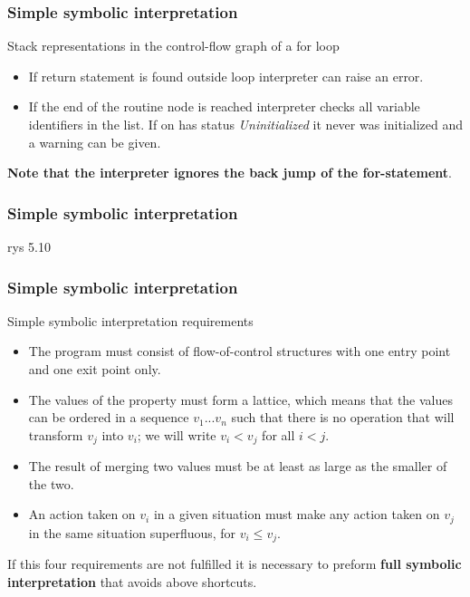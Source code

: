 \documentclass[presentation]{beamer}
\begin{document}
\begin{frame}
  \frametitle{Simple symbolic interpretation}
  \begin{block}{Stack representations in the control-flow graph of a for loop}
  \begin{itemize}
      \item If return statement is found outside loop interpreter can raise an error.
      \item If the end of the routine node is reached interpreter checks all variable identifiers in the list. If on has status \emph{Uninitialized} it never was initialized and a warning can be given.
  \end{itemize}
  \textbf{Note that the interpreter ignores the back jump of the for-statement}.
  \end{block}
  
\end{frame}

\begin{frame}
  \frametitle{Simple symbolic interpretation}
  rys 5.10
  
\end{frame}

\begin{frame}
  \frametitle{Simple symbolic interpretation}
  \begin{block}{Simple symbolic interpretation requirements}
  \begin{itemize}
      \item The program must consist of flow-of-control structures with one entry point and one exit point only.
      \item The values of the property must form a lattice, which means that the values can be ordered in a sequence $v_1...v_n$ such that there is no operation that will transform $v_j$ into $v_i$; we will write $v_i < v_j$ for all $i<j$.
      \item The result of merging two values must be at least as large as the smaller of the two.
      \item An action taken on $v_i$ in a given situation must make any action taken on $v_j$ in the same situation superfluous, for $v_i \leq v_j$.
  \end{itemize}
  \end{block}
  \begin{block}{}
  If this four requirements are not fulfilled it is necessary to preform \textbf{full symbolic interpretation} that avoids above shortcuts.
  \end{block}
\end{frame}
\end{document}
